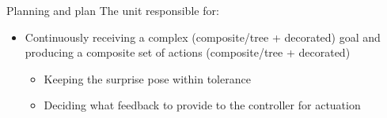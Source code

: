 \begin{frame}[allowframebreaks]{Planning and plan}
    The unit responsible for:
    \begin{itemize}
        \item Continuously receiving a complex (composite/tree + decorated) goal and producing a composite set of actions (composite/tree + decorated)
        \begin{itemize}
            \item Keeping the surprise pose within tolerance
            \item Deciding what feedback to provide to the controller for actuation
        \end{itemize}
    \end{itemize}
\end{frame}
